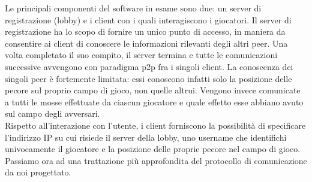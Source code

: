 Le principali componenti del software in esame sono due: un server di 
registrazione (lobby) e i client con i quali interagiscono i giocatori.
Il server di registrazione ha lo scopo di fornire un unico punto di accesso, 
in maniera da consentire ai client di conoscere le informazioni rilevanti degli 
altri peer. Una volta completato il suo compito, il server termina e tutte le 
comunicazioni successive avvengono con paradigma p2p fra i singoli client.
La conoscenza dei singoli peer è fortemente limitata: essi conoscono infatti 
solo la posizione delle pecore sul proprio campo di gioco, non quelle altrui. 
Vengono invece comunicate a tutti le mosse effettuate da ciascun giocatore e 
quale effetto esse abbiano avuto sul campo degli avversari.
\\
Rispetto all'interazione con l'utente, i client forniscono la possibilità di 
specificare l'indirizzo IP su cui risiede il server della lobby, uno username 
che identifichi univocamente il giocatore e la posizione delle proprie pecore 
nel campo di gioco.
\\
Passiamo ora ad una trattazione più approfondita del protocollo di 
comunicazione da noi progettato.

